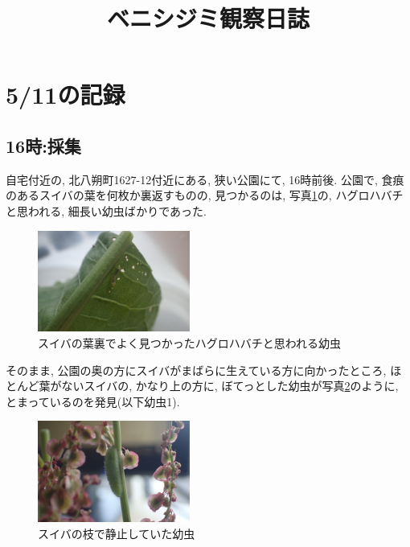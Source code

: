 \documentclass{jsarticle}
\title{ベニシジミ観察日誌}
\begin{document}
\maketitle

\section{5/11の記録}

\subsection{16時:採集}
自宅付近の, 北八朔町1627-12付近にある, 狭い公園にて, 16時前後. 
公園で, 食痕のあるスイバの葉を何枚か裏返すものの, 見つかるのは, 写真\ref{pic-hagurohabachi}の, ハグロハバチと思われる, 細長い幼虫ばかりであった. 
\begin{figure}[htbp]
  \begin{center}
    \includegraphics[width=5cm]{photo/hagurohabachi1.JPG}
    \caption{スイバの葉裏でよく見つかったハグロハバチと思われる幼虫}
    \label{pic-hagurohabachi}
  \end{center}
\end{figure}

そのまま, 公園の奥の方にスイバがまばらに生えている方に向かったところ, ほとんど葉がないスイバの, かなり上の方に, ぼてっとした幼虫が写真\ref{pic-sitting-on-branch}のように, とまっているのを発見(以下幼虫1). 
\begin{figure}[htbp]
  \begin{center}
    \includegraphics[width=5cm]{photo/sitting_on_branch.JPG}
    \caption{スイバの枝で静止していた幼虫}
    \label{pic-sitting-on-branch}
  \end{center}
\end{figure}
\end{document}
